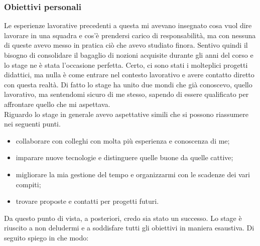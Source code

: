 \subsubsection{Obiettivi personali}
\label{sec:obiettivi-pers}
Le esperienze lavorative precedenti a questa mi avevano insegnato cosa vuol dire lavorare in una squadra e cos'è prendersi carico
di responsabilità, ma con nessuna di queste avevo messo in pratica ciò che avevo studiato finora. Sentivo quindi il bisogno di consolidare
il bagaglio di nozioni acquisite durante gli anni del corso e lo stage ne è stata l'occasione perfetta. Certo, ci sono stati i molteplici
progetti didattici, ma nulla è come entrare nel contesto lavorativo e avere contatto diretto con questa realtà. Di fatto
lo stage ha unito due mondi che già conoscevo, quello lavorativo, ma sentendomi sicuro di me stesso, sapendo di essere
qualificato per affrontare quello che mi aspettava. \\
Riguardo lo stage in generale avevo aspettative simili che si possono riassumere nei seguenti punti.
\begin{itemize}
	\item collaborare con colleghi con molta più esperienza e conoscenza di me;
	\item imparare nuove tecnologie e distinguere quelle buone da quelle cattive;
	\item migliorare la mia gestione del tempo e organizzarmi con le scadenze dei vari compiti;
	\item trovare proposte e contatti per progetti futuri.
\end{itemize}

Da questo punto di vista, a posteriori, credo sia stato un successo. Lo stage è riuscito a non deludermi e a soddisfare
tutti gli obiettivi in maniera esaustiva. Di seguito spiego in che modo:

